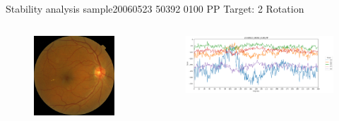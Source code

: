 \documentclass{beamer}
\begin{document}
\begin{frame}{Stability analysis sample}{20060523 50392 0100 PP Target: 2 Rotation}
\begin{columns}
\begin{column}{0.3\textwidth}
	\begin{figure}[p]
		\centering
		\includegraphics[width=\textwidth]{chapter_stability/20060523_50392_0100_PP/20060523_50392_0100_PP.jpeg}
	\end{figure}	
\end{column}
\begin{column}{0.45\textwidth}  %
	\begin{figure}[p]
		\centering
		\includegraphics[width=\textwidth]{chapter_stability/20060523_50392_0100_PP/r/scores.png}
	\end{figure}
	\centering
	\href{run:videos_stability/Messidor_20060523_50392_0100_PP_Target_2_Checking_Rotation_Sensitivity.mp4}{\color{blue}{Rotation Visualization}} 
\end{column}
\end{columns}
\end{frame}
\end{document}

